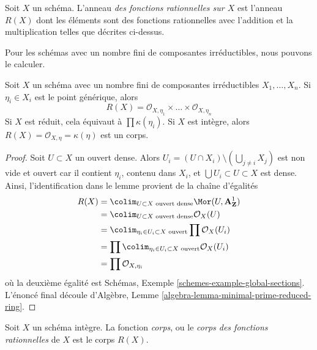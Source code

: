 \begin{definition}
\label{definition-ring-of-rational-functions}
Soit $X$ un schéma. L'anneau {\it des fonctions rationnelles sur $X$}
est l'anneau $R(X)$ dont les éléments sont des fonctions rationnelles avec
l'addition et la multiplication telles que décrites ci-dessus.
\end{definition}

\noindent
Pour les schémas avec un nombre fini de composantes irréductibles, nous pouvons le calculer.

\begin{lemma}
\label{lemma-integral-scheme-rational-functions}
Soit $X$ un schéma avec un nombre fini de composantes irréductibles
$X_1, \ldots, X_n$. Si $\eta_i \in X_i$ est le point générique, alors
$$
R(X) = \mathcal{O}_{X, \eta_1} \times \ldots \times \mathcal{O}_{X, \eta_n}
$$
Si $X$ est réduit, cela équivaut à $\prod \kappa(\eta_i)$.
Si $X$ est intègre, alors $R(X) = \mathcal{O}_{X, \eta} = \kappa(\eta)$ est un
corps.
\end{lemma}

\begin{proof}
Soit $U \subset X$ un ouvert dense. Alors
$U_i = (U \cap X_i) \setminus (\bigcup_{j \not = i} X_j)$ est non vide et ouvert car il contient
$\eta_i$, contenu dans $X_i$, et $\bigcup U_i \subset U \subset X$
est dense. Ainsi, l'identification
dans le lemme provient de la chaîne d'égalités
\begin{align*}
R(X)
& =
\colim_{U \subset X\text{ ouvert dense}} \Mor(U, \mathbf{A}^1_\mathbf{Z}) \\
& =
\colim_{U \subset X\text{ ouvert dense}} \mathcal{O}_X(U) \\
& =
\colim_{\eta_i \in U_i \subset X\text{ ouvert}} \prod \mathcal{O}_X(U_i) \\
& =
\prod \colim_{\eta_i \in U_i \subset X\text{ ouvert}} \mathcal{O}_X(U_i) \\
& =
\prod \mathcal{O}_{X, \eta_i}
\end{align*}
où la deuxième égalité
est Schémas, Exemple \ref{schemes-example-global-sections}.
L'énoncé final
découle d'Algèbre, Lemme \ref{algebra-lemma-minimal-prime-reduced-ring}.
\end{proof}

\begin{definition}
\label{definition-function-field}
Soit $X$ un schéma intègre. La fonction {\it
corps}, ou le {\it corps des fonctions rationnelles }
de $X$ est le corps $R(X)$.
\end{definition}

